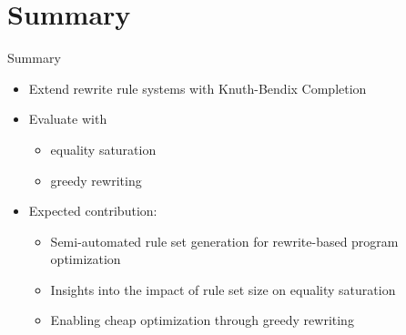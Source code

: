\documentclass[14pt, aspectratio=169]{beamer}
\begin{document}
	\section{Summary}
	\begin{frame}{Summary}
		\begin{itemize}
			\item Extend rewrite rule systems with Knuth-Bendix Completion
			\item Evaluate with
			\begin{itemize}
				\item equality saturation
				\item greedy rewriting
			\end{itemize}
			\item Expected contribution:
			\begin{itemize}
				\item Semi-automated rule set generation for rewrite-based program optimization
				\item Insights into the impact of rule set size on equality saturation
				\item Enabling cheap optimization through greedy rewriting
			\end{itemize}
		\end{itemize}
	\end{frame}
\end{document}
